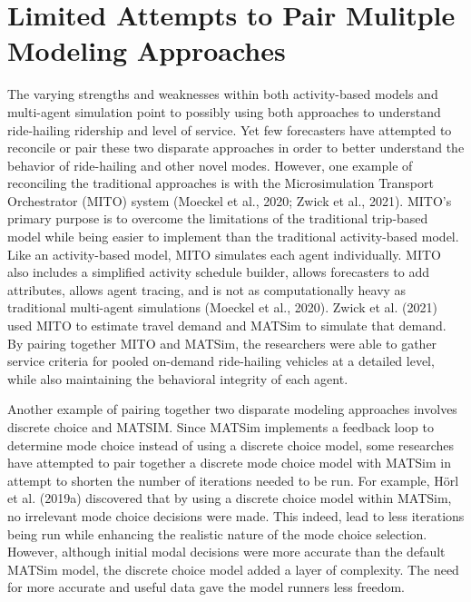 \documentclass[simple, masters, twoside]{byuthesis}
\begin{document}
\hypertarget{limited-attempts-to-pair-mulitple-modeling-approaches}{%
\section{Limited Attempts to Pair Mulitple Modeling Approaches}\label{limited-attempts-to-pair-mulitple-modeling-approaches}}

The varying strengths and weaknesses within both activity-based models and multi-agent simulation point to possibly using both approaches to understand ride-hailing ridership and level of service. Yet few forecasters have attempted to reconcile or pair these two disparate approaches in order to better understand the behavior of ride-hailing and other novel modes. However, one example of reconciling the traditional approaches is with the Microsimulation Transport Orchestrator (MITO) system (Moeckel et al., 2020; Zwick et al., 2021). MITO's primary purpose is to overcome the limitations of the traditional trip-based model while being easier to implement than the traditional activity-based model. Like an activity-based model, MITO simulates each agent individually. MITO also includes a simplified activity schedule builder, allows forecasters to add attributes, allows agent tracing, and is not as computationally heavy as traditional multi-agent simulations (Moeckel et al., 2020). Zwick et al. (2021) used MITO to estimate travel demand and MATSim to simulate that demand. By pairing together MITO and MATSim, the researchers were able to gather service criteria for pooled on-demand ride-hailing vehicles at a detailed level, while also maintaining the behavioral integrity of each agent.

Another example of pairing together two disparate modeling approaches involves discrete choice and MATSIM. Since MATSim implements a feedback loop to determine mode choice instead of using a discrete choice model, some researches have attempted to pair together a discrete mode choice model with MATSim in attempt to shorten the number of iterations needed to be run. For example, Hörl et al. (2019a) discovered that by using a discrete choice model within MATSim, no irrelevant mode choice decisions were made. This indeed, lead to less iterations being run while enhancing the realistic nature of the mode choice selection. However, although initial modal decisions were more accurate than the default MATSim model, the discrete choice model added a layer of complexity. The need for more accurate and useful data gave the model runners less freedom.
\end{document}
